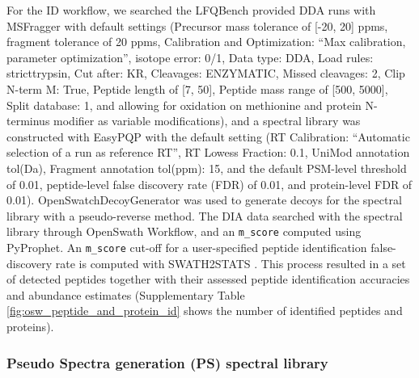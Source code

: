 \documentclass[10pt,letterpaper]{article}
\begin{document}
For the ID workflow, we searched the LFQBench provided DDA runs with MSFragger\cite{kong2017msfragger} with default settings (Precursor mass tolerance of [-20, 20] ppms, fragment tolerance of 20 ppms, Calibration and Optimization: ``Max calibration, parameter optimization'', isotope error: 0/1, Data type: DDA, Load rules: stricttrypsin, Cut after: KR, Cleavages: ENZYMATIC, Missed cleavages: 2, Clip N-term M: True, Peptide length of [7, 50], Peptide mass range of [500, 5000], Split database: 1, and allowing for oxidation on methionine and protein N-terminus modifier as variable modifications), and a spectral library was constructed with EasyPQP \cite{easypqp} with the default setting (RT Calibration: ``Automatic selection of a run as reference RT'', RT Lowess Fraction: 0.1, UniMod annotation tol(Da), Fragment annotation tol(ppm): 15, and the default PSM-level threshold of 0.01, peptide-level false discovery rate (FDR) of 0.01, and protein-level FDR of 0.01). OpenSwatchDecoyGenerator was used to generate decoys for the spectral library with a pseudo-reverse method. The DIA data searched with the spectral library through OpenSwath Workflow, and an \texttt{m\_score} computed using PyProphet\cite{teleman2015diana}. An \texttt{m\_score} cut-off for a user-specified peptide identification false-discovery rate is computed with SWATH2STATS \cite{blattmann2016swath2stats}. This process resulted in a set of detected peptides together with their assessed peptide identification accuracies and abundance estimates (Supplementary Table \ref{fig:osw_peptide_and_protein_id} shows the number of identified peptides and proteins).


\subsubsection*{Pseudo Spectra generation (PS) spectral library}
\end{document}
